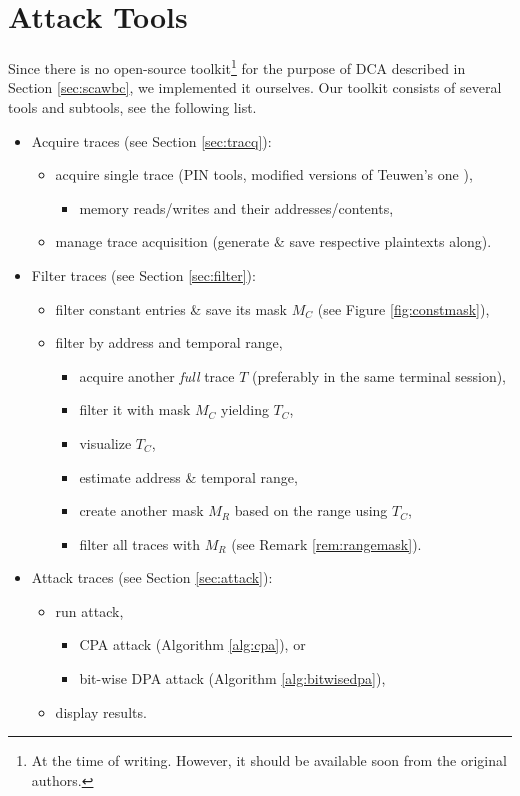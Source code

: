 \section{Attack Tools}
\label{sec:tools}

Since there is no open-source toolkit\footnote{At the time of writing. However, it should be available soon from the original authors.} for the purpose of DCA described in Section \ref{sec:scawbc}, we implemented it ourselves. Our toolkit consists of several tools and subtools, see the following list.


\begin{itemize}
	\item Acquire traces (see Section \ref{sec:tracq}):
	\begin{itemize}
		\item acquire single trace (PIN tools, modified versions of Teuwen's one \cite{teuwen2015movfuscator}),
		\begin{itemize}
			\item memory reads/writes and their addresses/contents,
		\end{itemize}
		\item manage trace acquisition (generate \& save respective plaintexts along).
	\end{itemize}
	\item Filter traces (see Section \ref{sec:filter}):
	\begin{itemize}
		\item filter constant entries \& save its mask $M_C$ (see Figure \ref{fig:constmask}),
		\item filter by address and temporal range,
		\begin{itemize}
			\item acquire another {\em full} trace $T$ (preferably in the same terminal session),
			\item filter it with mask $M_C$ yielding $T_C$,
			\item visualize $T_C$,
			\item estimate address \& temporal range,
			\item create another mask $M_R$ based on the range using $T_C$,
			\item filter all traces with $M_R$ (see Remark \ref{rem:rangemask}).
		\end{itemize}
	\end{itemize}
	\item Attack traces (see Section \ref{sec:attack}):
	\begin{itemize}
		\item run attack,
		\begin{itemize}
			\item CPA attack (Algorithm \ref{alg:cpa}), or
			\item bit-wise DPA attack (Algorithm \ref{alg:bitwisedpa}),
		\end{itemize}
		\item display results.
	\end{itemize}
\end{itemize}
